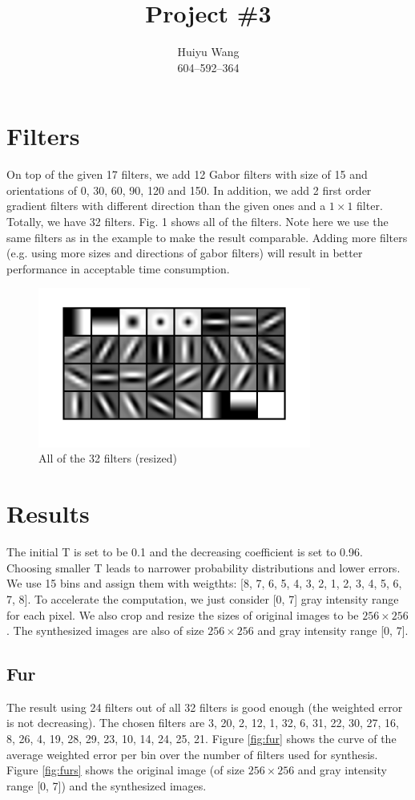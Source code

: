 \documentclass[11pt, oneside]{article}   	%
\title{Project \#3}
\author{Huiyu Wang\\604--592--364}
\date{}							%
\begin{document}
\maketitle

\section{Filters}
On top of the given 17 filters, we add 12 Gabor filters with size of 15 and orientations of 0, 30, 60, 90, 120 and 150. In addition, we add 2 first order gradient filters with different direction than the given ones and a $1\times1$ filter. Totally, we have 32 filters. Fig. 1 shows all of the filters. Note here we use the same filters as in the example to make the result comparable. Adding more filters (e.g. using more sizes and directions of gabor filters) will result in better performance in acceptable time consumption.
\begin{figure}[H]
	\centering
	\includegraphics[width=0.8\textwidth]{filters}
	\caption{All of the 32 filters (resized)}
	\label {fig:plot}
\end{figure}

\section{Results}
The initial T is set to be 0.1 and the decreasing coefficient is set to 0.96. Choosing smaller T leads to narrower probability distributions and lower errors. We use 15 bins and assign them with weigthts: [8, 7, 6, 5, 4, 3, 2, 1, 2, 3, 4, 5, 6, 7, 8]. To accelerate the computation, we just consider [0, 7] gray intensity range for each pixel. We also crop and resize the sizes of original images to be $256 \times 256$. The synthesized images are also of size $256 \times 256$ and gray intensity range [0, 7].

\subsection{Fur}
The result using 24 filters out of all 32 filters is good enough (the weighted error is not decreasing). The chosen filters are 3, 20, 2, 12, 1, 32, 6, 31, 22, 30, 27, 16, 8, 26, 4, 19, 28, 29, 23, 10, 14, 24, 25, 21. Figure \ref{fig:fur} shows the curve of the average weighted error per bin over the number of filters used for synthesis. Figure \ref{fig:furs} shows the original image (of size $256 \times 256$ and gray intensity range [0, 7]) and the synthesized images.
\end{document}
